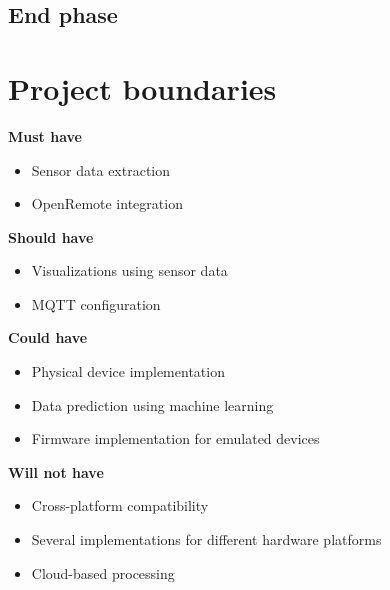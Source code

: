 \documentclass{report}
\begin{document}
	\section{End phase}\label{end_phase}
	
	
	\chapter{Project boundaries} \label{project_boundaries}
	
	\textbf{Must have}
	\begin{itemize}
		\item Sensor data extraction
		\item OpenRemote integration
	\end{itemize}
	
	\textbf{Should have}
	\begin{itemize}
		\item Visualizations using sensor data
		\item MQTT configuration
	\end{itemize}
	
	\textbf{Could have}
	\begin{itemize}
		\item Physical device implementation
		\item Data prediction using machine learning
		\item Firmware implementation for emulated devices
	\end{itemize}
	
	\textbf{Will not have}
	\begin{itemize}
		\item Cross-platform compatibility
		\item Several implementations for different hardware platforms 
		\item Cloud-based processing
	\end{itemize}
	
\end{document}
